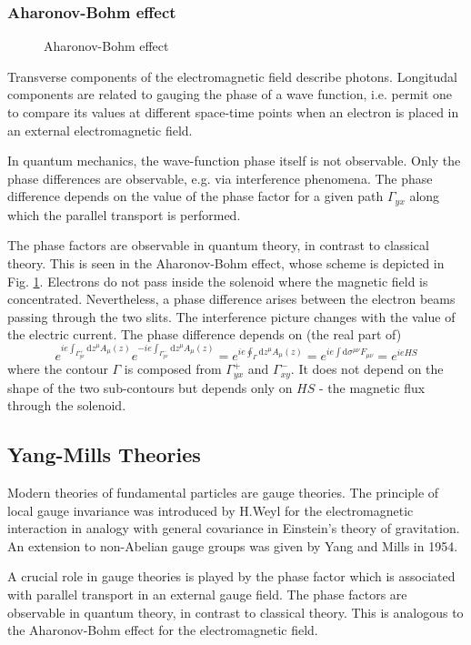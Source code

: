 \subsubsection{Aharonov-Bohm effect}
\begin{figure}
  \label{fig:aharonov}
  \centering
  \caption{Aharonov-Bohm effect}
\end{figure}
Transverse components of the  electromagnetic field describe photons.
Longitudal components are related to gauging the phase of a wave function, i.e.
permit one to compare its values at different space-time points when an
electron is placed in an external electromagnetic field.
\par In quantum mechanics, the wave-function phase itself is not observable.
Only the phase differences are observable, e.g. via interference phenomena. The
phase difference depends on the value of the phase factor for a  given path
$\Gamma_{yx}$ along which the parallel transport is performed.
\par The phase factors are observable in quantum theory, in contrast to
classical theory. This is seen in the Aharonov-Bohm effect, whose scheme is
depicted in Fig. \ref{fig:aharonov}. Electrons do not pass inside the solenoid
where the magnetic field is concentrated. Nevertheless, a phase difference
arises between the electron beams passing through the two slits. The
interference picture changes with the value of the electric current.
The phase difference depends on (the real part of)
\begin{equation}
e^{ie\int_{\Gamma^+_{yx}}\mathrm{d}z^\mu A_\mu(z)}
e^{-ie\int_{\Gamma^-_{yx}}\mathrm{d}z^\mu A_\mu(z)}
  = e^{ie\oint_\Gamma\mathrm{d}z^\mu A_\mu(z)}
  = e^{ie\int\mathrm{d}\sigma^{\mu\nu}F_{\mu\nu}} = e^{ieHS}
\end{equation}
where the contour $\Gamma$ is composed from $\Gamma^+_{yx}$ and
$\Gamma^-_{xy}$. It does not depend on the shape of the two sub-contours but
depends only on $HS$ - the magnetic flux through the solenoid.
\subsection{Yang-Mills Theories}
Modern theories of fundamental particles are gauge theories. The principle of
local gauge invariance was introduced by H.Weyl for the electromagnetic
interaction in analogy with general covariance in Einstein's theory of
gravitation. An extension to non-Abelian gauge groups was given by Yang and
Mills in 1954.
\par A crucial role in gauge theories is played by the phase factor which is
associated with parallel transport in an external gauge field. The phase
factors are observable in quantum theory, in contrast to classical theory. This
is analogous to the  Aharonov-Bohm effect for the electromagnetic field.

